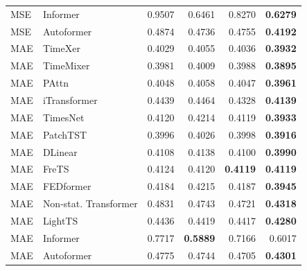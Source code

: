 \begin{longtable}{llrrrr}
MSE & Informer & 0.9507 & 0.6461 & 0.8270 & \textbf{0.6279} \\
MSE & Autoformer & 0.4874 & 0.4736 & 0.4755 & \textbf{0.4192} \\
\midrule
MAE & TimeXer & 0.4029 & 0.4055 & 0.4036 & \textbf{0.3932} \\
MAE & TimeMixer & 0.3981 & 0.4009 & 0.3988 & \textbf{0.3895} \\
MAE & PAttn & 0.4048 & 0.4058 & 0.4047 & \textbf{0.3961} \\
MAE & iTransformer & 0.4439 & 0.4464 & 0.4328 & \textbf{0.4139} \\
MAE & TimesNet & 0.4120 & 0.4214 & 0.4119 & \textbf{0.3933} \\
MAE & PatchTST & 0.3996 & 0.4026 & 0.3998 & \textbf{0.3916} \\
MAE & DLinear & 0.4108 & 0.4138 & 0.4100 & \textbf{0.3990} \\
MAE & FreTS & 0.4124 & 0.4120 & \textbf{0.4119} & \textbf{0.4119} \\
MAE & FEDformer & 0.4184 & 0.4215 & 0.4187 & \textbf{0.3945} \\
MAE & Non-stat. Transformer & 0.4831 & 0.4743 & 0.4721 & \textbf{0.4318} \\
MAE & LightTS & 0.4436 & 0.4419 & 0.4417 & \textbf{0.4280} \\
MAE & Informer & 0.7717 & \textbf{0.5889} & 0.7166 & 0.6017 \\
MAE & Autoformer & 0.4775 & 0.4744 & 0.4705 & \textbf{0.4301} \\
\end{longtable}
\endgroup

